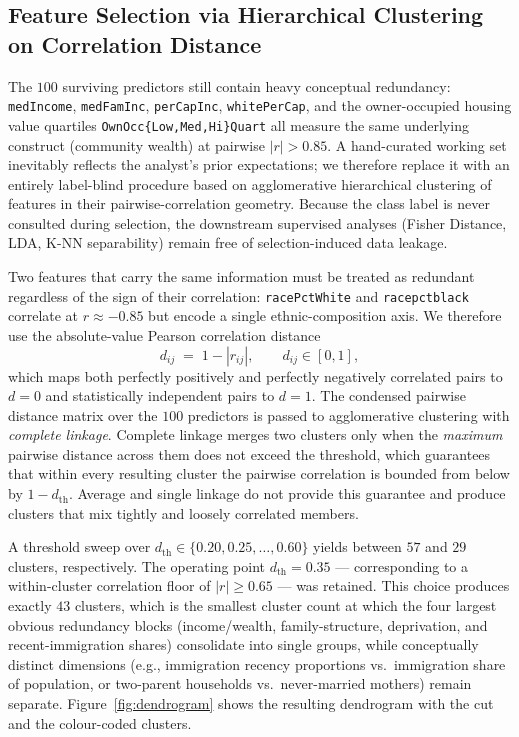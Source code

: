 \documentclass{ieeeaccess}
\begin{document}
\subsection{Feature Selection via Hierarchical Clustering on Correlation Distance}
\label{ssec:fselect}
The $100$ surviving predictors still contain heavy conceptual redundancy: \texttt{medIncome}, \texttt{medFamInc}, \texttt{perCapInc}, \texttt{whitePerCap}, and the owner-occupied housing value quartiles \texttt{OwnOcc\{Low,Med,Hi\}Quart} all measure the same underlying construct (community wealth) at pairwise $|r| > 0.85$. A hand-curated working set inevitably reflects the analyst's prior expectations; we therefore replace it with an entirely label-blind procedure based on agglomerative hierarchical clustering \cite{hastie} of features in their pairwise-correlation geometry. Because the class label is never consulted during selection, the downstream supervised analyses (Fisher Distance, LDA, K-NN separability) remain free of selection-induced data leakage.

Two features that carry the same information must be treated as redundant regardless of the sign of their correlation: \texttt{racePctWhite} and \texttt{racepctblack} correlate at $r \approx -0.85$ but encode a single ethnic-composition axis. We therefore use the absolute-value Pearson correlation distance
\begin{equation}
d_{ij} \;=\; 1 - |r_{ij}|, \qquad d_{ij}\in[0,1],
\label{eq:corrdist}
\end{equation}
which maps both perfectly positively and perfectly negatively correlated pairs to $d=0$ and statistically independent pairs to $d=1$. The condensed pairwise distance matrix over the $100$ predictors is passed to agglomerative clustering with \emph{complete linkage}. Complete linkage merges two clusters only when the \emph{maximum} pairwise distance across them does not exceed the threshold, which guarantees that within every resulting cluster the pairwise correlation is bounded from below by $1 - d_{\mathrm{th}}$. Average and single linkage do not provide this guarantee and produce clusters that mix tightly and loosely correlated members.

A threshold sweep over $d_{\mathrm{th}}\in\{0.20, 0.25, \ldots, 0.60\}$ yields between $57$ and $29$ clusters, respectively. The operating point $d_{\mathrm{th}} = 0.35$ --- corresponding to a within-cluster correlation floor of $|r|\geq 0.65$ --- was retained. This choice produces exactly $43$ clusters, which is the smallest cluster count at which the four largest obvious redundancy blocks (income/wealth, family-structure, deprivation, and recent-immigration shares) consolidate into single groups, while conceptually distinct dimensions (e.g., immigration recency proportions vs.\ immigration share of population, or two-parent households vs.\ never-married mothers) remain separate. Figure~\ref{fig:dendrogram} shows the resulting dendrogram with the cut and the colour-coded clusters.
\end{document}
